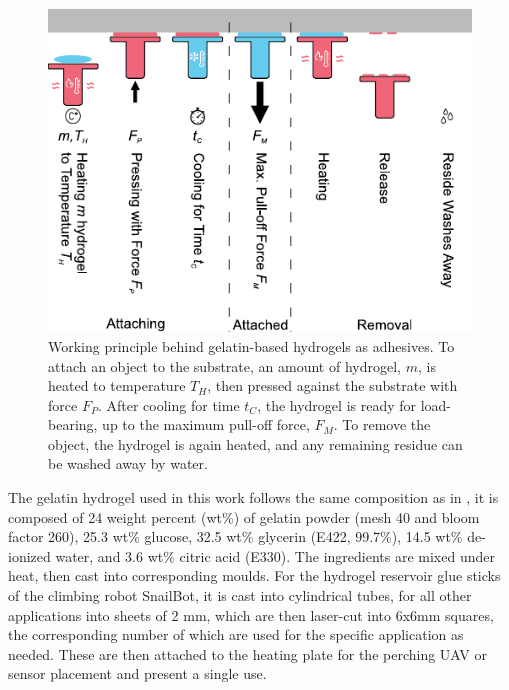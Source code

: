\begin{figure}
  \includegraphics[width=\linewidth]{figures/fig-schematic/fig-schematic.pdf}
  \caption{Working principle behind gelatin-based hydrogels as adhesives. To attach an object to the substrate, an amount of  hydrogel, $m$, is heated to temperature $T_H$, then pressed against the substrate with force $F_P$. After cooling for time $t_C$, the hydrogel is ready for load-bearing, up to the maximum pull-off force, $F_M$. To remove the object, the hydrogel is again heated, and any remaining residue can be washed away by water.}
  \label{fig:fig-schematic}
\end{figure}

The gelatin hydrogel used in this work follows the same composition as in \cite{Geckeler2023b}, it is composed of 24 weight percent (wt\%) of gelatin powder (mesh 40 and bloom factor 260), 25.3 wt\% glucose, 32.5 wt\% glycerin (E422, 99.7\%), 14.5 wt\% de-ionized water, and 3.6 wt\% citric acid (E330). The ingredients are mixed under heat, then cast into corresponding moulds. For the hydrogel reservoir glue sticks of the climbing robot SnailBot, it is cast into cylindrical tubes, for all other applications into sheets of 2 mm, which are then laser-cut into 6x6mm squares, the corresponding number of which are used for the specific application as needed. These are then attached to the heating plate for the perching UAV or sensor placement and present a single use.



